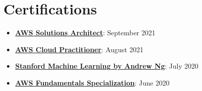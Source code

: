 \documentclass[letterpaper,11pt]{article}
\newcommand{\resumeItem}[2]{
  \item[]\small{
    \textbf{#1}{: #2 \vspace{-2pt}}
  }
}
\newcommand{\resumeSubHeadingListStart}{\begin{itemize}[leftmargin=1mm]}
\newcommand{\resumeSubHeadingListEnd}{\end{itemize}}
\begin{document}
\section{Certifications}
 \resumeSubHeadingListStart
   \resumeItem{\href{https://www.credly.com/badges/ef46fdf4-2c55-474d-a963-9ee14107160f}{AWS Solutions Architect}}
   {September 2021}
   \resumeItem{\href{https://www.credly.com/badges/c8d7f47f-c6c1-4af9-8391-5b509b92b271}{AWS Cloud Practitioner}}
     {August 2021}
   \resumeItem{\href{https://coursera.org/share/29802cca497e8680b26b241d0ef50b59}{Stanford Machine Learning by Andrew Ng}}
     {July 2020}
   \resumeItem{\href{https://coursera.org/share/daef661212dab251985d69e4fb71f730}{AWS Fundamentals Specialization}}
     {June 2020}
 \resumeSubHeadingListEnd

\end{document}

